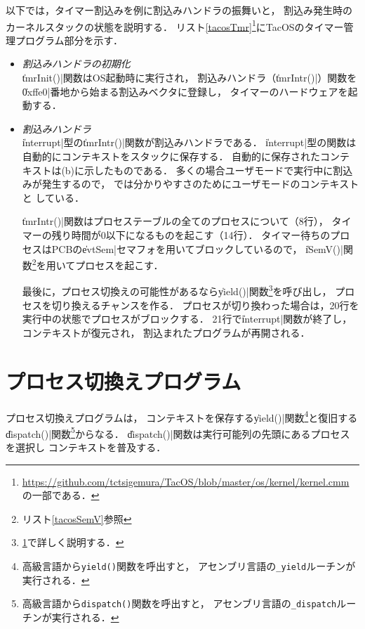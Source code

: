 以下では，タイマー割込みを例に割込みハンドラの振舞いと，
割込み発生時のカーネルスタックの状態を説明する．
リスト\ref{tacosTmr}\footnote{
  \url{https://github.com/tctsigemura/TacOS/blob/master/os/kernel/kernel.cmm}
  の一部である．
}にTacOSのタイマー管理プログラム部分を示す．



\begin{itemize}
\item \emph{割込みハンドラの初期化} \\
  \|tmrInit()|関数はOS起動時に実行され，
  割込みハンドラ（\|tmrIntr()|）関数を
  \|0xffe0|番地から始まる割込みベクタに登録し，
  タイマーのハードウェアを起動する．
\item \emph{割込みハンドラ} \\
  \|interrupt|型の\|tmrIntr()|関数が割込みハンドラである．
  \|interrupt|型の関数は自動的にコンテキストをスタックに保存する．
  自動的に保存されたコンテキストは(b)に示したものである．
  多くの場合ユーザモードで実行中に割込みが発生するので，
  では分かりやすさのためにユーザモードのコンテキストと
  している．

  \|tmrIntr()|関数はプロセステーブルの全てのプロセスについて（8行），
  タイマーの残り時間が0以下になるものを起こす（14行）．
  タイマー待ちのプロセスはPCBの\|evtSem|セマフォを用いてブロックしているので，
  \|iSemV()|関数\footnote{
    リスト\ref{tacosSemV}参照
  }を用いてプロセスを起こす．

  最後に，プロセス切換えの可能性があるなら\|yield()|関数\footnote{
    \ref{tacosProcSwitch}で詳しく説明する．
  }を呼び出し，
  プロセスを切り換えるチャンスを作る．
  プロセスが切り換わった場合は，20行を実行中の状態でプロセスがブロックする．
  21行で\|interrupt|関数が終了し，コンテキストが復元され，
  割込まれたプログラムが再開される．
\end{itemize}

\section{プロセス切換えプログラム}
\label{tacosProcSwitch}
プロセス切換えプログラムは，
コンテキストを保存する\|yield()|関数\footnote{
  高級言語から\texttt{yield()}関数を呼出すと，
  アセンブリ言語の\texttt{\_yield}ルーチンが実行される．
}と復旧する\|dispatch()|関数\footnote{
  高級言語から\texttt{dispatch()}関数を呼出すと，
  アセンブリ言語の\texttt{\_dispatch}ルーチンが実行される．
}からなる．
\|dispatch()|関数は実行可能列の先頭にあるプロセスを選択し
コンテキストを普及する．


